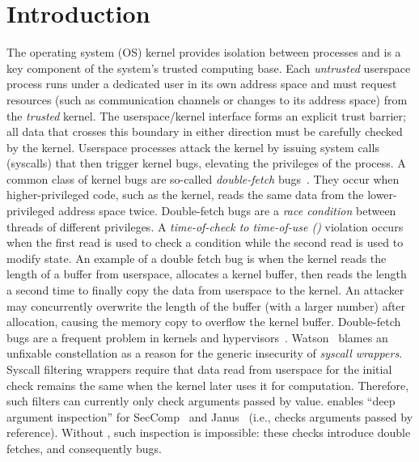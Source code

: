 \section{Introduction}

The operating system (OS) kernel provides isolation between processes and is
a key component of the system's trusted computing base. 
Each \emph{untrusted} userspace process runs under a
dedicated user in its own address space and must request resources (such as
communication channels or changes to its address space) from the \emph{trusted}
kernel. The userspace/kernel interface forms an explicit trust barrier;
all data that crosses this boundary in either direction must be carefully
checked by the kernel.
%
Userspace processes attack the kernel by issuing system calls (syscalls) that then trigger
kernel bugs, elevating the privileges of the process.
%
A common class of kernel bugs are so-called \emph{double-fetch}
bugs~\cite{serna08doublefetch, twizsgrakky07ring0, wilhelm2016xenpwn,
wang2018survey}. They occur when higher-privileged code, such as
the kernel, reads the same data from the lower-privileged address space twice.
%
Double-fetch bugs are a
\emph{race condition} between threads of different privileges. A
\emph{time-of-check to time-of-use (\tocttou)} violation occurs when the first
read is used to check a condition while the second read is used to modify
state.
%
An example of a double fetch bug is when the kernel reads the length of a buffer
from userspace, allocates a kernel buffer, then reads the length a second time
to finally copy the data from userspace to the kernel. An attacker may concurrently
overwrite the length of the buffer (with a larger number) after allocation,
causing the memory copy to overflow the kernel buffer.
%
Double-fetch bugs are a frequent problem in kernels and
hypervisors~\cite{cve201812633, cve202012652, cve20131332, cve201920610,
cve20158550, cve201610439, cve201610435, cve201610433, cve20195519,
cve20168438}.
Watson~\cite{watson2007exploiting} blames an unfixable \tocttou
constellation as a reason for the generic insecurity of \emph{syscall
wrappers}.
Syscall filtering wrappers require that data read from userspace for the
initial check remains the same when the kernel later uses it for computation.
Therefore, such filters can currently only check arguments passed by value.
\midas enables ``deep argument inspection'' for SecComp~\cite{seccomp_deep, seccomp}
and Janus~\cite{wagner1999janus}
(i.e., checks arguments passed by reference).
Without \midas, such inspection is impossible: these checks
introduce double fetches, and consequently \tocttou bugs.

